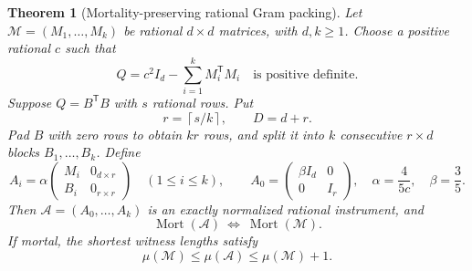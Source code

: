 \documentclass[11pt,letterpaper]{article}
\numberwithin{equation}{section}
\newtheorem{theorem}{Theorem}[section]
\theoremstyle{definition}
\theoremstyle{remark}
\newcommand{\Mort}{\operatorname{Mort}}
\begin{document}
\begin{theorem}[Mortality-preserving rational Gram packing]
\label{pqc:qm:thm:packing}
Let $\mathcal M=(M_1,\ldots,M_k)$ be rational $d\times d$ matrices, with $d,k\geq1$. Choose a positive rational $c$ such that
\begin{equation}
 Q=c^2I_d-\sum_{i=1}^k M_i^{\mathsf T}M_i
 \quad\text{is positive definite}.
 \label{pqc:qm:eq:residualQ}
\end{equation}
Suppose $Q=B^{\mathsf T}B$ with $s$ rational rows. Put
\[
 r=\left\lceil s/k\right\rceil,\qquad D=d+r.
\]
Pad $B$ with zero rows to obtain $kr$ rows, and split it into $k$ consecutive $r\times d$ blocks $B_1,\ldots,B_k$. Define
\begin{equation}
 A_i=\alpha
 \begin{pmatrix}M_i&0_{d\times r}\\B_i&0_{r\times r}\end{pmatrix}
 \quad(1\leq i\leq k),\qquad
 A_0=\begin{pmatrix}\beta I_d&0\\0&I_r\end{pmatrix},
 \quad
 \alpha=\frac{4}{5c},\quad\beta=\frac35.
 \label{pqc:qm:eq:packed}
\end{equation}
Then $\mathcal A=(A_0,\ldots,A_k)$ is an exactly normalized rational instrument, and
\begin{equation}
 \Mort(\mathcal A)\ \Longleftrightarrow\ \Mort(\mathcal M).
 \label{pqc:qm:eq:equiv}
\end{equation}
If mortal, the shortest witness lengths satisfy
\begin{equation}
 \mu(\mathcal M)\leq\mu(\mathcal A)\leq\mu(\mathcal M)+1.
 \label{pqc:qm:eq:length}
\end{equation}
\end{theorem}
\end{document}
